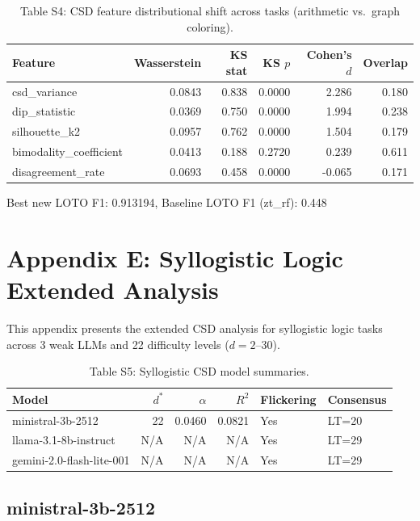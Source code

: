 \documentclass[11pt]{article}
\begin{document}
\begin{table}[h]\centering\small
\caption{Table S4: CSD feature distributional shift across tasks (arithmetic vs.\ graph coloring).}
\label{tab:feature_shift}
\begin{tabular}{l|r|r|r|r|r}
\toprule
Feature & Wasserstein & KS stat & KS $p$ & Cohen's $d$ & Overlap \\
\midrule
csd\_variance & 0.0843 & 0.838 & 0.0000 & 2.286 & 0.180 \\
dip\_statistic & 0.0369 & 0.750 & 0.0000 & 1.994 & 0.238 \\
silhouette\_k2 & 0.0957 & 0.762 & 0.0000 & 1.504 & 0.179 \\
bimodality\_coefficient & 0.0413 & 0.188 & 0.2720 & 0.239 & 0.611 \\
disagreement\_rate & 0.0693 & 0.458 & 0.0000 & -0.065 & 0.171 \\
\bottomrule
\end{tabular}
\end{table}

Best new LOTO F1: 0.913194, Baseline LOTO F1 (zt\_rf): 0.448


\clearpage


\section{Appendix E: Syllogistic Logic Extended Analysis}
\label{app:syllogistic}

This appendix presents the extended CSD analysis for syllogistic logic
tasks across 3 weak LLMs and 22 difficulty levels ($d=2$--$30$).

\begin{table}[h]\centering\small
\caption{Table S5: Syllogistic CSD model summaries.}
\label{tab:syllogistic_summary}
\begin{tabular}{l|r|r|r|l|l}
\toprule
Model & $d^*$ & $\alpha$ & $R^2$ & Flickering & Consensus \\
\midrule
ministral-3b-2512 & 22 & 0.0460 & 0.0821 & Yes & LT=20 \\
llama-3.1-8b-instruct & N/A & N/A & N/A & Yes & LT=29 \\
gemini-2.0-flash-lite-001 & N/A & N/A & N/A & Yes & LT=29 \\
\bottomrule
\end{tabular}
\end{table}

\subsection{ministral-3b-2512}
\end{document}
